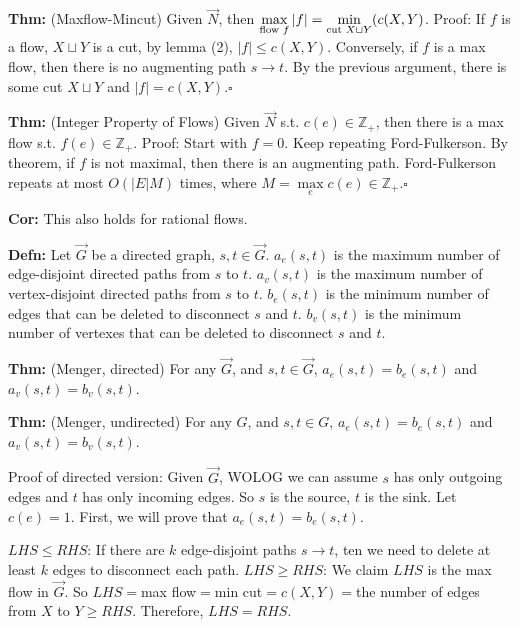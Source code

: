 \documentclass[10pt,letterpaper]{article}
\newcommand{\n}{\hfill\break}
\newcommand{\defn}[1]{\par\noindent\settowidth{\hangindent}{\textbf{Defn: }}\textbf{Defn: }#1\n}
\newcommand{\thm}[1]{\par\noindent\settowidth{\hangindent}{\textbf{Thm: }}\textbf{Thm: }#1\n}
\newcommand{\cor}[1]{\par\noindent\settowidth{\hangindent}{\textbf{Cor: }}\textbf{Cor: }#1\n}
\newcommand{\proven}{\;$\square$\n}
\newcommand{\ptxt}[1]{\textrm{\textnormal{#1}}}
\newcommand{\card}[1]{\left|#1\right|}
\newcommand{\integers}{\mathbb{Z}}
\newcommand{\Z}{\integers}
\newcommand{\st}{s.t.}
\begin{document}
\thm{(Maxflow-Mincut) Given $\vec{N}$, then $\underset{\ptxt{flow }f}{\max}\card{f}=\underset{\ptxt{cut }X\sqcup{}Y}{\min}(c(X,Y)$.\n
Proof: If $f$ is a flow, $X\sqcup{}Y$ is a cut, by lemma (2), $\card{f}\le{}c(X,Y)$.\n
Conversely, if $f$ is a max flow, then there is no augmenting path $s\to{}t$. By the previous argument, there is some cut $X\sqcup{}Y$ and $\card{f}=c(X,Y)$.\proven}

\newpage
\thm{(Integer Property of Flows) Given $\vec{N}$ \st{} $c(e)\in\Z_{+}$, then there is a max flow \st{} $f(e)\in\Z_{+}$.\n
Proof: Start with $f=0$. Keep repeating Ford-Fulkerson. By theorem, if $f$ is not maximal, then there is an augmenting path.\n
Ford-Fulkerson repeats at most $O(\card{E}M)$ times, where $M=\underset{e}{\max{}}c(e)\in\Z_{+}$.\proven}

\cor{This also holds for rational flows.}

\defn{Let $\vec{G}$ be a directed graph, $s,t\in\vec{G}$.\n
$a_{e}(s,t)$ is the maximum number of edge-disjoint directed paths from $s$ to $t$.\n
$a_{v}(s,t)$ is the maximum number of vertex-disjoint directed paths from $s$ to $t$.\n
$b_{e}(s,t)$ is the minimum number of edges that can be deleted to disconnect $s$ and $t$.\n
$b_{v}(s,t)$ is the minimum number of vertexes that can be deleted to disconnect $s$ and $t$.}

\thm{(Menger, directed) For any $\vec{G}$, and $s,t\in\vec{G}$, $a_{e}(s,t)=b_{e}(s,t)$ and $a_{v}(s,t)=b_{v}(s,t)$.}

\thm{(Menger, undirected) For any $G$, and $s,t\in{}G$, $a_{e}(s,t)=b_{e}(s,t)$ and $a_{v}(s,t)=b_{v}(s,t)$.}

\par\noindent Proof of directed version: Given $\vec{G}$, WOLOG we can assume $s$ has only outgoing edges and $t$ has only incoming edges. So $s$ is the source, $t$ is the sink. Let $c(e)=1$. First, we will prove that $a_{e}(s,t)=b_{e}(s,t)$.\n

\par\noindent $LHS\le{}RHS$: If there are $k$ edge-disjoint paths $s\to{}t$, ten we need to delete at least $k$ edges to disconnect each path.\n
$LHS\ge{}RHS$: We claim $LHS$ is the max flow in $\vec{G}$.\n
So $LHS=$max flow$=$min cut$=c(X,Y)=$the number of edges from $X$ to $Y\ge{}RHS$.\n
Therefore, $LHS=RHS$.
\end{document}
